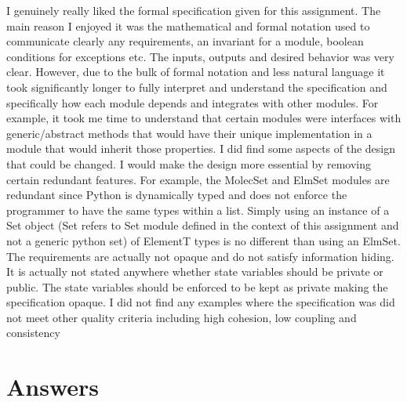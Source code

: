 \documentclass[12pt]{article}
\begin{document}
I genuinely really liked the formal specification given for this assignment. The main reason I enjoyed it was the mathematical and formal notation used to communicate clearly any requirements, an invariant for a module, boolean conditions for exceptions etc. The inputs, outputs and desired behavior was very clear. However, due to the bulk of formal notation and less natural language it took significantly longer to fully interpret and understand the specification and specifically how each module depends and integrates with other modules. For example, it took me time to understand that certain modules were interfaces with generic/abstract methods that would have their unique implementation in a module that would inherit those properties. I did find some aspects of the design that could be changed. I would make the design more essential by removing certain redundant features. For example, the MolecSet and ElmSet modules are redundant since Python is dynamically typed and does not enforce the programmer to have the same types within a list. Simply using an instance of a Set object (Set refers to Set module defined in the context of this assignment and not a generic python set) of ElementT types is no different than using an ElmSet. The requirements are actually not opaque and do not satisfy information hiding. It is actually not stated anywhere whether state variables should be private or public. The state variables should be enforced to be kept as private making the specification opaque. I did not find any examples where the specification was did not meet other quality criteria including high cohesion, low coupling and consistency

\section{Answers}
\end{document}
